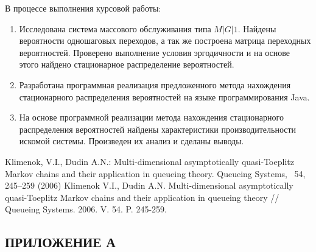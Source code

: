 \documentclass[12pt, a4paper]{article}
\begin{document}
В процессе выполнения курсовой работы:

\begin{flushleft}
	\begin{enumerate}
		\item Исследована система массового обслуживания типа $M|G|1$. Найдены вероятности одношаговых переходов, а так же построена матрица переходных вероятностей. Проверено выполнение условия эргодичности и на основе этого найдено стационарное распределение вероятностей.
		\item Разработана программная реализация предложенного метода нахождения стационарного распределения вероятностей на языке программирования Java.
		\item На основе программной реализации метода нахождения стационарного распределения вероятностей найдены характеристики производительности искомой системы. Произведен их анализ и сделаны выводы. 
	\end{enumerate}
\end{flushleft}
\newpage
\begin{thebibliography}{20}
	Klimenok, V.I., Dudin A.N.:  Multi-dimensional asymptotically quasi-Toeplitz Markov
	chains and their application in queueing theory.  Queueing Systems, ~54,  245--259 (2006)
	Klimenok  V.I.,   Dudin A.N.  Multi-dimensional asymptotically quasi-Toeplitz
	Markov chains and their application in queueing theory // Queueing
	Systems. 2006. V. 54. P. 245-259.
\end{thebibliography}
\pagebreak
\begin{center}\section*{ПРИЛОЖЕНИЕ А}\end{center}
\end{document}
